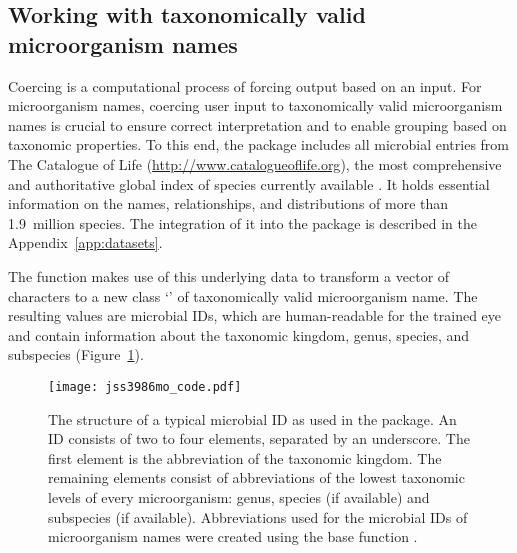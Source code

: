 \documentclass[article, shortnames]{jss}
\newcommand{\class}[1]{`\code{#1}'}
\newcommand{\fct}[1]{\code{#1()}}
\begin{document}
\subsection{Working with taxonomically valid microorganism names}

Coercing is a computational process of forcing output based on an input. 
For microorganism names, coercing user input to taxonomically valid
microorganism names is crucial to ensure correct interpretation and to
enable grouping based on taxonomic properties.  To this end, the 
package includes all microbial entries from The Catalogue of Life
(\url{http://www.catalogueoflife.org}), the most comprehensive and authoritative
global index of species currently available \citep{CoL-zq}.  It holds
essential information on the names, relationships, and distributions of more
than 1.9~million species.  The integration of it into the  package
is described in the Appendix~\ref{app:datasets}.

The \fct{as.mo} function makes use of this underlying data to transform a
vector of characters to a new class \class{mo} of taxonomically valid
microorganism name.  The resulting values are microbial IDs, which are
human-readable for the trained eye and contain information about the
taxonomic kingdom, genus, species, and subspecies (Figure~\ref{fig:mocode}).
%
\begin{figure}[t!]
\centering
\texttt{[image: jss3986mo\_code.pdf]}
\caption{\label{fig:mocode} The structure of a typical microbial ID as used
in the  package.  An ID consists of two to four elements, separated
by an underscore.  The first element is the abbreviation of the taxonomic
kingdom.  The remaining elements consist of abbreviations of the lowest
taxonomic levels of every microorganism: genus, species (if available) and
subspecies (if available).  Abbreviations used for the microbial IDs of
microorganism names were created using the base  function
\fct{abbreviate}.}
\end{figure}
%
\end{document}
